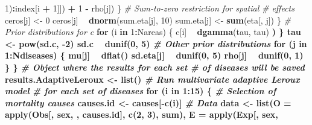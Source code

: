 \documentclass[]{article}
\newenvironment{Shaded}{\begin{snugshade}}{\end{snugshade}}
\newcommand{\KeywordTok}[1]{\textcolor[rgb]{0.13,0.29,0.53}{\textbf{#1}}}
\newcommand{\DataTypeTok}[1]{\textcolor[rgb]{0.13,0.29,0.53}{#1}}
\newcommand{\DecValTok}[1]{\textcolor[rgb]{0.00,0.00,0.81}{#1}}
\newcommand{\FloatTok}[1]{\textcolor[rgb]{0.00,0.00,0.81}{#1}}
\newcommand{\StringTok}[1]{\textcolor[rgb]{0.31,0.60,0.02}{#1}}
\newcommand{\CommentTok}[1]{\textcolor[rgb]{0.56,0.35,0.01}{\textit{#1}}}
\newcommand{\ControlFlowTok}[1]{\textcolor[rgb]{0.13,0.29,0.53}{\textbf{#1}}}
\newcommand{\OperatorTok}[1]{\textcolor[rgb]{0.81,0.36,0.00}{\textbf{#1}}}
\newcommand{\NormalTok}[1]{#1}
\begin{document}
\begin{Shaded}
\begin{Highlighting}[]
\StringTok{                  }\DecValTok{1}\NormalTok{)}\OperatorTok{:}\NormalTok{index[i }\OperatorTok{+}\StringTok{ }\DecValTok{1}\NormalTok{]]) }\OperatorTok{+}\StringTok{ }\DecValTok{1} \OperatorTok{-}\StringTok{ }
\StringTok{                }\NormalTok{rho[j])}
\NormalTok{        \}}
        \CommentTok{# Sum-to-zero restriction for spatial}
        \CommentTok{# effects}
\NormalTok{        ceros[j] <-}\StringTok{ }\DecValTok{0}
\NormalTok{        ceros[j] }\OperatorTok{~}\StringTok{ }\KeywordTok{dnorm}\NormalTok{(sum.eta[j], }\DecValTok{10}\NormalTok{)}
\NormalTok{        sum.eta[j] <-}\StringTok{ }\KeywordTok{sum}\NormalTok{(eta[, j])}
\NormalTok{    \}}
    \CommentTok{# Prior distributions for c}
    \ControlFlowTok{for}\NormalTok{ (i }\ControlFlowTok{in} \DecValTok{1}\OperatorTok{:}\NormalTok{Nareas) \{}
\NormalTok{        c[i] }\OperatorTok{~}\StringTok{ }\KeywordTok{dgamma}\NormalTok{(tau, tau) }\OperatorTok{%_%}\StringTok{ }\KeywordTok{I}\NormalTok{(}\FloatTok{0.001}\NormalTok{, }
\NormalTok{            )}
\NormalTok{    \}}
\NormalTok{    tau <-}\StringTok{ }\KeywordTok{pow}\NormalTok{(sd.c, }\OperatorTok{-}\DecValTok{2}\NormalTok{)}
\NormalTok{    sd.c }\OperatorTok{~}\StringTok{ }\KeywordTok{dunif}\NormalTok{(}\DecValTok{0}\NormalTok{, }\DecValTok{5}\NormalTok{)}
    \CommentTok{# Other prior distributions}
    \ControlFlowTok{for}\NormalTok{ (j }\ControlFlowTok{in} \DecValTok{1}\OperatorTok{:}\NormalTok{Ndiseases) \{}
\NormalTok{        mu[j] }\OperatorTok{~}\StringTok{ }\KeywordTok{dflat}\NormalTok{()}
\NormalTok{        sd.eta[j] }\OperatorTok{~}\StringTok{ }\KeywordTok{dunif}\NormalTok{(}\DecValTok{0}\NormalTok{, }\DecValTok{5}\NormalTok{)}
\NormalTok{        rho[j] }\OperatorTok{~}\StringTok{ }\KeywordTok{dunif}\NormalTok{(}\DecValTok{0}\NormalTok{, }\DecValTok{1}\NormalTok{)}
\NormalTok{    \}}
\NormalTok{\}}
\CommentTok{# Object where the results for each set}
\CommentTok{# of diseases will be saved}
\NormalTok{results.AdaptiveLeroux <-}\StringTok{ }\KeywordTok{list}\NormalTok{()}
\CommentTok{# Run multivariate adaptive Leroux model}
\CommentTok{# for each set of diseases}
\ControlFlowTok{for}\NormalTok{ (i }\ControlFlowTok{in} \DecValTok{1}\OperatorTok{:}\DecValTok{15}\NormalTok{) \{}
    \CommentTok{# Selection of mortality causes}
\NormalTok{    causes.id <-}\StringTok{ }\NormalTok{causes[}\OperatorTok{-}\KeywordTok{c}\NormalTok{(i)]}
    \CommentTok{# Data}
\NormalTok{    data <-}\StringTok{ }\KeywordTok{list}\NormalTok{(}\DataTypeTok{O =} \KeywordTok{apply}\NormalTok{(Obs[, sex, , causes.id], }
        \KeywordTok{c}\NormalTok{(}\DecValTok{2}\NormalTok{, }\DecValTok{3}\NormalTok{), sum), }\DataTypeTok{E =} \KeywordTok{apply}\NormalTok{(Exp[, sex, }
}
\end{Highlighting}
\end{Shaded}
\end{document}
